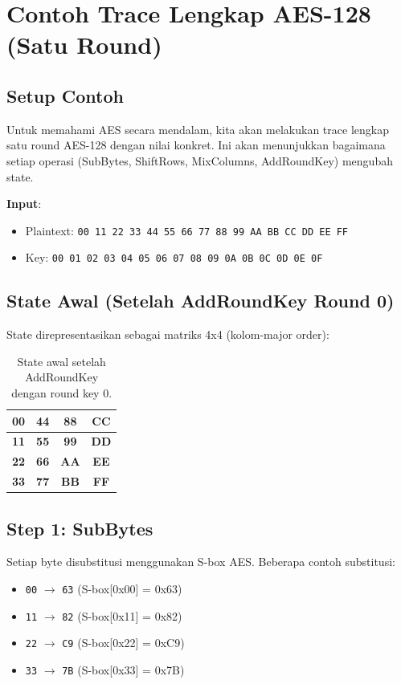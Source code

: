 \section{Contoh Trace Lengkap AES-128 (Satu Round)}

\subsection{Setup Contoh}

Untuk memahami AES secara mendalam, kita akan melakukan trace lengkap satu round AES-128 dengan nilai konkret. Ini akan menunjukkan bagaimana setiap operasi (SubBytes, ShiftRows, MixColumns, AddRoundKey) mengubah state.

\textbf{Input}:
\begin{itemize}
  \item Plaintext: \texttt{00 11 22 33 44 55 66 77 88 99 AA BB CC DD EE FF}
  \item Key: \texttt{00 01 02 03 04 05 06 07 08 09 0A 0B 0C 0D 0E 0F}
\end{itemize}

\subsection{State Awal (Setelah AddRoundKey Round 0)}

State direpresentasikan sebagai matriks 4x4 (kolom-major order):

\begin{table}[htbp]
  \centering
  \small
  \begin{tabular}{|c|c|c|c|}
    \hline
    \textbf{00} & \textbf{44} & \textbf{88} & \textbf{CC} \\
    \hline
    \textbf{11} & \textbf{55} & \textbf{99} & \textbf{DD} \\
    \hline
    \textbf{22} & \textbf{66} & \textbf{AA} & \textbf{EE} \\
    \hline
    \textbf{33} & \textbf{77} & \textbf{BB} & \textbf{FF} \\
    \hline
  \end{tabular}
  \caption{State awal setelah AddRoundKey dengan round key 0.}
\end{table}

\subsection{Step 1: SubBytes}

Setiap byte disubstitusi menggunakan S-box AES. Beberapa contoh substitusi:
\begin{itemize}
  \item \texttt{00} $\rightarrow$ \texttt{63} (S-box[0x00] = 0x63)
  \item \texttt{11} $\rightarrow$ \texttt{82} (S-box[0x11] = 0x82)
  \item \texttt{22} $\rightarrow$ \texttt{C9} (S-box[0x22] = 0xC9)
  \item \texttt{33} $\rightarrow$ \texttt{7B} (S-box[0x33] = 0x7B)
\end{itemize}

